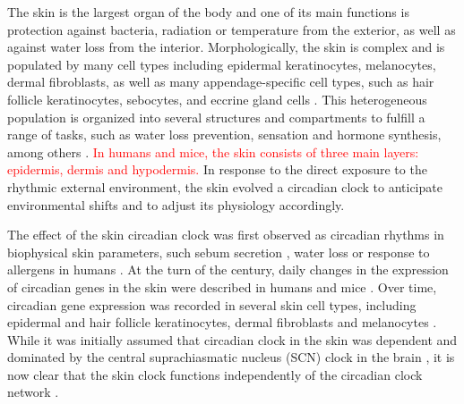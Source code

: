 The skin is the largest organ of the body and one of its main functions is protection against bacteria, radiation or temperature from the exterior, as well as against water loss from the interior. Morphologically, the skin is complex and is populated by many cell types including epidermal keratinocytes, melanocytes, dermal fibroblasts, as well as many appendage-specific cell types, such as hair follicle keratinocytes, sebocytes, and eccrine gland cells \cite{Plikus2015}. This heterogeneous population is organized into several structures and compartments to fulfill a range of tasks, such as water loss prevention, sensation and hormone synthesis, among others \cite{Wong2016, Zouboulis2009}. \textcolor{red}{In humans and mice, the skin consists of three main layers: epidermis, dermis and hypodermis.} In response to the direct exposure to the rhythmic external environment, the skin evolved a circadian clock \cite{Allada2021} to anticipate environmental shifts and to adjust its physiology accordingly. 

\newpage

The effect of the skin circadian clock was first observed as circadian rhythms in biophysical skin parameters, such sebum secretion \cite{Burton1970}, water loss \cite{Spruit1971} or response to allergens in humans \cite{Reinberg1965}. At the turn of the century, daily changes in the expression of circadian genes in the skin were described in humans \cite{Bjarnason2001} and mice \cite{Oishi2002}. Over time, circadian gene expression was recorded in several skin cell types, including epidermal and hair follicle keratinocytes, dermal fibroblasts and melanocytes \cite{Zanello2000, Kawara2002, Brown2005, Brown2008, Spoerl2011}.  While it was initially assumed that circadian clock in the skin was dependent and dominated by the central suprachiasmatic nucleus (SCN) clock in the brain \cite{Tanioka2009}, it is now clear that the skin clock functions independently of the circadian clock network \cite{Welz2019} .

